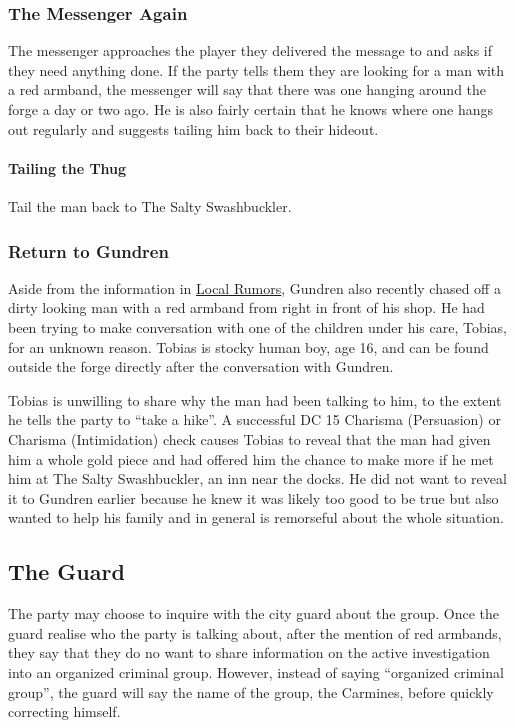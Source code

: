\documentclass[10pt,twocolumn,openany,nodeprecatedcode,bg=none,inline]{dndbook}
\begin{document}
\subsubsection{The Messenger Again}
\label{sec:messengerReturns}
The messenger approaches the player they delivered the message to and asks if they need anything done.
If the party tells them they are looking for a man with a red armband, the messenger will say that there was one hanging around the forge a day or two ago.
He is also fairly certain that he knows where one hangs out regularly and suggests tailing him back to their hideout.

\paragraph{Tailing the Thug}
Tail the man back to The Salty Swashbuckler.

\subsubsection{Return to Gundren}
\label{sec:returnGundren}
Aside from the information in \hyperref[sec:rumors]{Local Rumors}, Gundren also recently chased off a dirty looking man with a red armband from right in front of his shop.
He had been trying to make conversation with one of the children under his care, Tobias, for an unknown reason.
Tobias is stocky human boy, age 16, and can be found outside the forge directly after the conversation with Gundren.

Tobias is unwilling to share why the man had been talking to him, to the extent he tells the party to ``take a hike''.
A successful DC 15 Charisma (Persuasion) or Charisma (Intimidation) check causes Tobias to reveal that the man had given him a whole gold piece and had offered him the chance to make more if he met him at The Salty Swashbuckler, an inn near the docks.
He did not want to reveal it to Gundren earlier because he knew it was likely too good to be true but also wanted to help his family and in general is remorseful about the whole situation.

\subsection{The Guard}
The party may choose to inquire with the city guard about the group.
Once the guard realise who the party is talking about, after the mention of red armbands, they say that they do no want to share information on the active investigation into an organized criminal group.
However, instead of saying ``organized criminal group'', the guard will say the name of the group, the Carmines, before quickly correcting himself.
\end{document}
